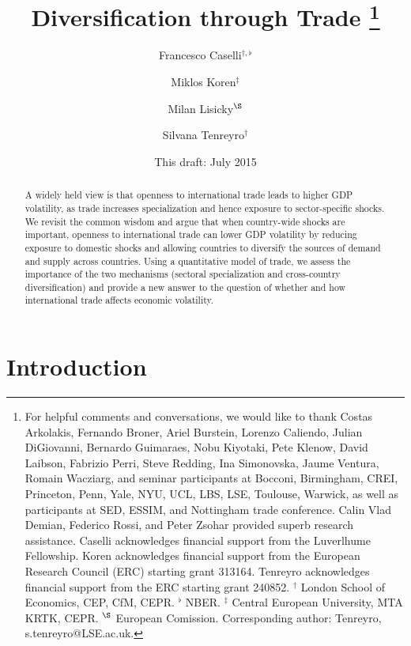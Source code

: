 \documentclass[12pt]{article}
\begin{document}
\title{Diversification through Trade \thanks{%
For helpful comments and conversations, we would like to thank Costas
Arkolakis, Fernando Broner, Ariel Burstein, Lorenzo Caliendo, Julian
DiGiovanni, Bernardo Guimaraes, Nobu Kiyotaki, Pete Klenow, David Laibson,
Fabrizio Perri, Steve Redding, Ina Simonovska, Jaume Ventura, Romain
Wacziarg, and seminar participants at Bocconi, Birmingham, CREI, Princeton,
Penn, Yale, NYU, UCL, LBS, LSE, Toulouse, Warwick, as well as participants
at SED, ESSIM, and Nottingham trade conference. Calin Vlad Demian, Federico
Rossi, and Peter Zsohar provided superb research assistance. Caselli
acknowledges financial support from the Luverlhume Fellowship. Koren
acknowledges financial support from the European Research Council (ERC)
starting grant 313164. Tenreyro acknowledges financial support from the ERC
starting grant 240852. \newline
$^{\dag }$ London School of Economics, CEP, CfM, CEPR. $^{\flat }$ NBER. $%
^{\ddag }$ Central European University, MTA KRTK, CEPR. $^{\S }$ European
Comission. Corresponding author: Tenreyro, s.tenreyro@LSE.ac.uk.} }
\author{Francesco Caselli$^{\dag ,\flat }$ \and Miklos Koren$^{\ddag }$ \and %
Milan Lisicky$^{\S }$ \and Silvana Tenreyro$^{\dag }$}
\date{This draft: July 2015}
\maketitle

\begin{abstract}
A widely held view is that openness to international trade leads to higher
GDP volatility, as trade increases specialization and hence exposure to
sector-specific shocks. We revisit the common wisdom and argue that when
country-wide shocks are important, openness to international trade can lower
GDP volatility by reducing exposure to domestic shocks and allowing
countries to diversify the sources of demand and supply across countries.
Using a quantitative model of trade, we assess the importance of the two
mechanisms (sectoral specialization and cross-country diversification) and
provide a new answer to the question of whether and how international trade
affects economic volatility.
\end{abstract}

\section{Introduction}
\end{document}
